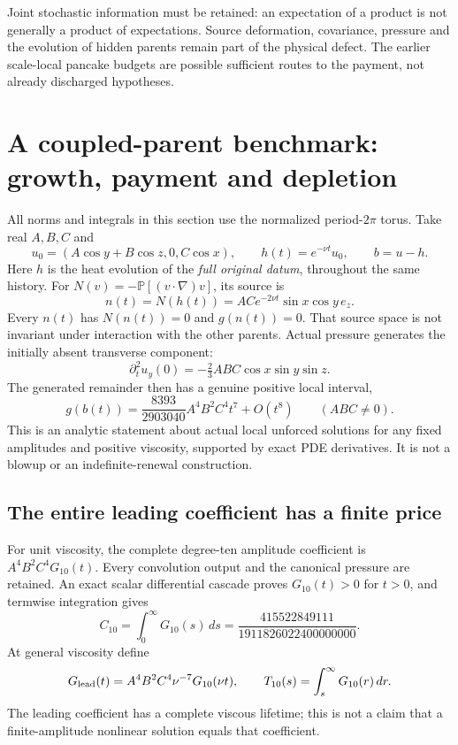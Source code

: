 \documentclass[11pt]{article}
\theoremstyle{definition}
\begin{document}
Joint stochastic information must be retained: an expectation of a product
is not generally a product of expectations. Source deformation, covariance,
pressure and the evolution of hidden parents remain part of the physical
defect. The earlier scale-local pancake budgets are possible sufficient
routes to the payment, not already discharged hypotheses.

\section{A coupled-parent benchmark: growth, payment and depletion}
\label{sec:current-benchmark}

All norms and integrals in this section use the normalized period-$2\pi$
torus. Take real $A,B,C$ and
\[
 u_0=(A\cos y+B\cos z,0,C\cos x),\qquad
 h(t)=e^{-\nu t}u_0,\qquad b=u-h.
\]
Here $h$ is the heat evolution of the \emph{full original datum}, throughout
the same history. For $N(v)=-\mathbb P[(v\cdot\nabla)v]$, its source is
\[
 n(t)=N(h(t))=ACe^{-2\nu t}\sin x\cos y\,e_z.
\]
Every $n(t)$ has $N(n(t))=0$ and $g(n(t))=0$. That source space is not
invariant under interaction with the other parents. Actual pressure generates
the initially absent transverse component:
\[
 \partial_t^2 u_y(0)=-\tfrac23 ABC\cos x\sin y\sin z.
\]
The generated remainder then has a genuine positive local interval,
\begin{equation}\label{eq:current-onset}
 g(b(t))=\frac{8393}{2903040}A^4B^2C^4t^7+O(t^8)
 \qquad(ABC\ne0).
\end{equation}
This is an analytic statement about actual local unforced solutions for any
fixed amplitudes and positive viscosity, supported by exact PDE derivatives.
It is not a blowup or an indefinite-renewal construction.

\subsection{The entire leading coefficient has a finite price}

For unit viscosity, the complete degree-ten amplitude coefficient is
$A^4B^2C^4G_{10}(t)$. Every convolution output and the canonical pressure are
retained. An exact scalar differential cascade proves $G_{10}(t)>0$ for
$t>0$, and termwise integration gives
\[
 C_{10}=\int_0^\infty G_{10}(s)\,ds
 =\frac{415522849111}{1911826022400000000}.
\]
At general viscosity define
\[
 G_{\rm lead}(t)=A^4B^2C^4\nu^{-7}G_{10}(\nu t),\qquad
 T_{10}(s)=\int_s^\infty G_{10}(r)\,dr.
\]
The leading coefficient has a complete viscous lifetime; this is not a claim
that a finite-amplitude nonlinear solution equals that coefficient.
\end{document}

